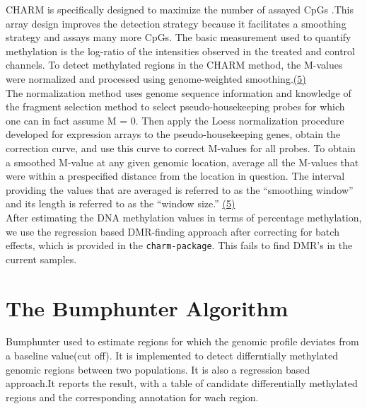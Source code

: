 \documentclass[11pt]{article}
\begin{document}
CHARM is specifically designed to maximize the number of assayed CpGs .This array design improves the detection strategy because it facilitates a smoothing strategy and assays many more CpGs.  The basic measurement used to quantify methylation is the log-ratio of the intensities observed in the treated and control channels. To detect methylated regions in the CHARM method, the M-values were normalized and processed using genome-weighted smoothing.\href{http://www.ncbi.nlm.nih.gov/pmc/articles/PMC2336799/}{(5)}\\

The normalization method uses genome sequence information and knowledge of the fragment selection method to select pseudo-housekeeping probes for which one can in fact assume M = 0. Then apply the Loess normalization procedure developed for expression arrays to the pseudo-housekeeping genes, obtain the correction curve, and use this curve to correct M-values for all probes. To obtain a smoothed M-value at any given genomic location, average all the M-values that were within a prespecified distance from the location in question. The interval providing the values that are averaged is referred to as the “smoothing window” and its length is referred to as the “window size.” \href{http://www.ncbi.nlm.nih.gov/pmc/articles/PMC2336799/}{(5)} \\

After estimating the DNA methylation values in terms of percentage methylation, we use the regression based DMR-finding approach after correcting for batch effects, which is provided in the {\tt charm-package}. This fails to find DMR’s in the current samples.


\section*{The Bumphunter Algorithm}


Bumphunter used to estimate regions for which the genomic profile deviates from a baseline value(cut off). It is implemented to detect differntially methylated genomic regions between two populations. It is also a regression based approach.It reports the result, with a table of candidate differentially methylated regions and the corresponding annotation for wach region.
\end{document}
